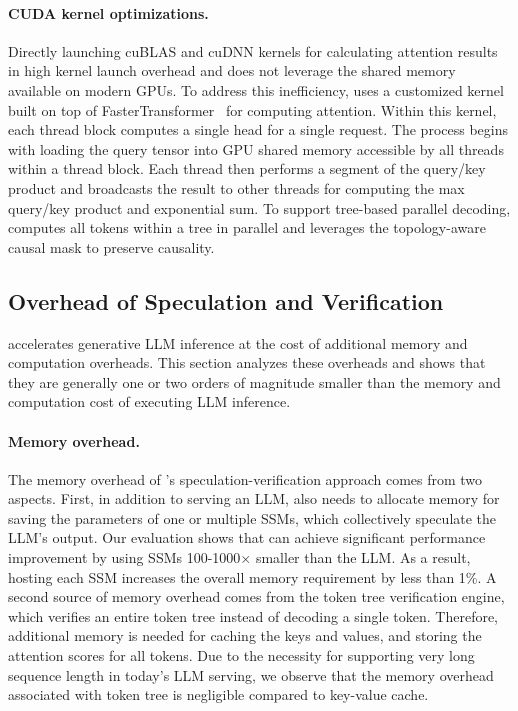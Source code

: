 \paragraph{CUDA kernel optimizations.}
Directly launching cuBLAS and cuDNN kernels for calculating attention results in high kernel launch overhead and does not leverage the shared memory available on modern GPUs. To address this inefficiency, \SpecInfer uses a customized kernel built on top of FasterTransformer~\cite{fastertransformer} for computing attention.
Within this kernel, each thread block computes a single head for a single request. The process begins with loading the query tensor into GPU shared memory accessible by all threads within a thread block. Each thread then performs a segment of the query/key product and broadcasts the result to other threads for computing the max query/key product and exponential sum.
To support tree-based parallel decoding, \SpecInfer computes all tokens within a tree in parallel and leverages the topology-aware causal mask to preserve causality.

\subsection{Overhead of Speculation and Verification}
\label{specinfer:subsec:overhead}
\SpecInfer accelerates generative LLM inference at the cost of additional memory and computation overheads. This section analyzes these overheads and shows that they are generally one or two orders of magnitude smaller than the memory and computation cost of executing LLM inference.

\paragraph{Memory overhead.} The memory overhead of \SpecInfer's speculation-verification approach comes from two aspects. First, in addition to serving an LLM, \SpecInfer also needs to allocate memory for saving the parameters of one or multiple SSMs, which collectively speculate the LLM's output.
Our evaluation shows that \SpecInfer can achieve significant performance improvement by using SSMs 100-1000$\times$ smaller than the LLM. As a result, hosting each SSM increases the overall memory requirement by less than 1\%.
A second source of memory overhead comes from the token tree verification engine, which verifies an entire token tree instead of decoding a single token.
Therefore, additional memory is needed for caching the keys and values, and storing the attention scores for all tokens.
Due to the necessity for supporting very long sequence length in today's LLM serving, we observe that the memory overhead associated with token tree is negligible compared to key-value cache.

